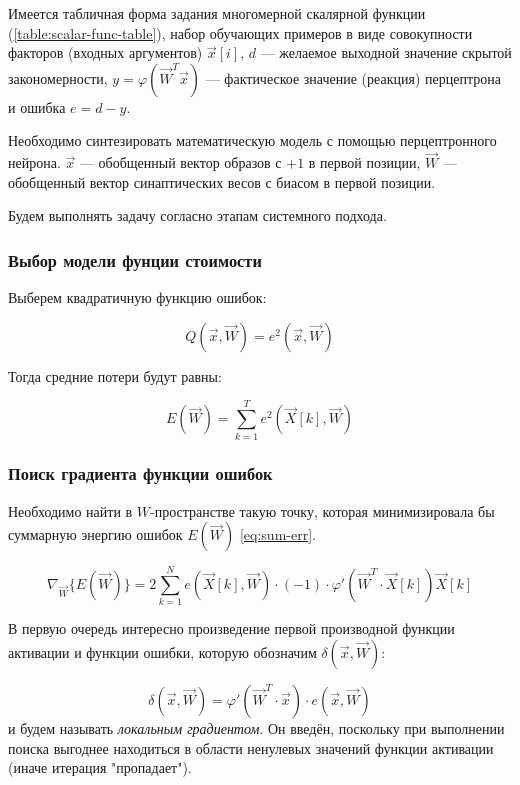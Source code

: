\documentclass{article}
\begin{document}
Имеется табличная форма задания многомерной скалярной функции (\ref{table:scalar-func-table}), 
набор обучающих примеров в виде совокупности факторов (входных аргументов) $\vec{x}[i]$, $d$ ---
желаемое выходной значение скрытой закономерности, $y = \varphi (\vec{W}^T \vec{x})$ ---
фактическое значение (реакция) перцептрона и ошибка $e = d - y$.

Необходимо синтезировать математическую модель с помощью перцептронного нейрона. 
$\vec{x}$ --- обобщенный вектор образов с $+1$ в первой позиции, $\vec{W}$ ---
обобщенный вектор синаптических весов с биасом в первой позиции.

Будем выполнять задачу согласно этапам системного подхода.



\subsubsection{Выбор модели фунции стоимости}

Выберем квадратичную функцию ошибок:

\begin{equation}
    Q(\vec{x}, \vec{W}) = e^2(\vec{x}, \vec{W})
\end{equation}

Тогда средние потери будут равны:
    
\begin{equation}
    E(\vec{W}) = \sum_{k=1}^{T} e^2 (\vec{X}[k], \vec{W})
    \label{eq:sum-err}
\end{equation}



\subsubsection{Поиск градиента функции ошибок}

Необходимо найти в $W$-пространстве такую точку, которая минимизировала бы суммарную энергию ошибок $E(\vec{W})$ \ref{eq:sum-err}.

\begin{equation}
    \nabla_{\vec{W}} \{ E(\vec{W}) \} = 2 \sum_{k=1}^{N} e (\vec{X}[k], \vec{W}) \cdot (-1)
    \cdot \varphi ' (\vec{W}^T \cdot \vec{X}[k]) \vec{X}[k]
\end{equation}

В первую очередь интересно произведение первой производной функции активации и функции ошибки, 
которую обозначим $\delta(\vec{x}, \vec{W})$:

\begin{equation}
    \delta(\vec{x}, \vec{W}) = \varphi ' (\vec{W}^{T} \cdot \vec{x}) \cdot e(\vec{x}, \vec{W})
\end{equation}
\noindent
и будем называть \textit{локальным градиентом}. 
Он введён, поскольку при выполнении поиска выгоднее находиться в области ненулевых значений
функции активации (иначе итерация "пропадает").
\end{document}
